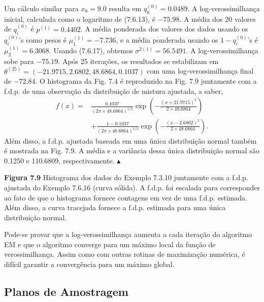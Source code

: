 Um cálculo similar para $x_8=9.0$ resulta em $q_8^{(0)}=0.0489$. A log-verossimilhança inicial, calculada como o logaritmo de (7.6.13), é $-75.98$. A média dos 20 valores de $q_i^{(0)}$ é $p^{(1)}=0.4402$. A média ponderada dos valores dos dados usando os $q_i^{(0)}$'s como pesos é $\mu_1^{(1)}=-7.736$, e a média ponderada usando os $1-q_i^{(0)}$'s é $\mu_2^{(1)}=6.3068$. Usando (7.6.17), obtemos $\sigma^{2(1)}=56.5491$. A log-verossimilhança sobe para $-75.19$. Após 25 iterações, os resultados se estabilizam em $\theta^{(25)}=(-21.9715, 2.6802, 48.6864, 0.1037)$ com uma log-verossimilhança final de $-72.84$. O histograma da Fig. 7.4 é reproduzido na Fig. 7.9 juntamente com a f.d.p. de uma observação da distribuição de mistura ajustada, a saber,
\begin{equation}
\begin{split}
f(x) = {} & \frac{0.1037}{(2\pi \times 48.6864)^{1/2}}\exp\left(-\frac{(x+21.9715)^2}{2\times 48.6864}\right) \\
& + \frac{1-0.1037}{(2\pi \times 48.6864)^{1/2}}\exp\left(-\frac{(x-2.6802)^2}{2\times 48.6864}\right).
\end{split}
\end{equation}
Além disso, a f.d.p. ajustada baseada em uma única distribuição normal também é mostrada na Fig. 7.9. A média e a variância dessa única distribuição normal são 0.1250 e 110.6809, respectivamente. $\blacktriangle$

\textbf{Figura 7.9} Histograma dos dados do Exemplo 7.3.10 juntamente com a f.d.p. ajustada do Exemplo 7.6.16 (curva sólida). A f.d.p. foi escalada para corresponder ao fato de que o histograma fornece contagens em vez de uma f.d.p. estimada. Além disso, a curva tracejada fornece a f.d.p. estimada para uma única distribuição normal.

Pode-se provar que a log-verossimilhança aumenta a cada iteração do algoritmo EM e que o algoritmo converge para um máximo local da função de verossimilhança. Assim como com outras rotinas de maximização numérica, é difícil garantir a convergência para um máximo global.

\subsection*{Planos de Amostragem}


